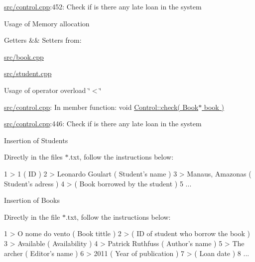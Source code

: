 \begin{DoxyItemize}
\hyperlink{control_8cpp}{src/control.\+cpp}\+:452\+: Check if is there any late loan in the system
\item Usage of Memory allocation

Getters \&\& Setters from\+:

\hyperlink{book_8cpp}{src/book.\+cpp}

\hyperlink{student_8cpp}{src/student.\+cpp}
\item Usage of operator overload \char`\"{}$<$\char`\"{}

\hyperlink{control_8cpp}{src/control.\+cpp}\+: In member function\+: \textquotesingle{}void \hyperlink{classControl_a234ad2973e4ad1e4cb9099f75dbdb05f}{Control\+::check( Book$\ast$ book )}\textquotesingle{}

\hyperlink{control_8cpp}{src/control.\+cpp}\+:446\+: Check if is there any late loan in the system
\item Insertion of Students

Directly in the files $\ast$.txt, follow the instructions below\+:
\end{DoxyItemize}


\begin{DoxyCode}
1 > 1             ( ID ) 
2 > Leonardo Goulart  ( Student's name )
3 > Manaus, Amazonas  ( Student's adress )
4 >           ( Book borrowed by the student )
5 ...
\end{DoxyCode}



\begin{DoxyItemize}
\item Insertion of Books

Directly in the file $\ast$.txt, follow the instructions below\+:
\end{DoxyItemize}


\begin{DoxyCode}
1 > O nome do vento   ( Book tittle )
2 >           ( ID of student who borrow the book )
3 > Available         ( Availability )
4 > Patrick Ruthfuss  ( Author's name )
5 > The archer        ( Editor's name )
6 > 2011          ( Year of publication )
7 >           ( Loan date )
8 ... 
\end{DoxyCode}
 